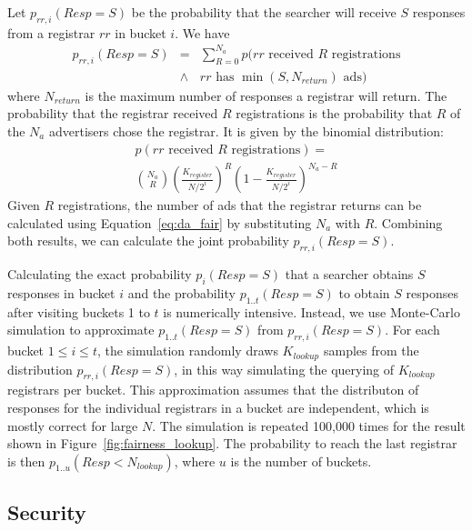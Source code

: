 Let $p_{rr,i}(Resp=S)$ be the probability that the searcher will receive $S$ responses from a registrar $rr$ in bucket $i$. We have
\begin{eqnarray*}
p_{rr,i}(Resp=S) & = & \sum_{R=0}^{N_a}{} p( \mbox{$rr$ received $R$ registrations}\\
                        & \wedge &  \mbox{$rr$ has $\min(S,N_\textit{return})$ ads})
\end{eqnarray*}
where $N_\textit{return}$ is the maximum number of responses a registrar will return. The probability that the registrar received $R$ registrations is the probability that $R$ of the $N_a$ advertisers chose the registrar. It is given by the binomial distribution:
\begin{eqnarray*}
p(\mbox{$rr$ received $R$ registrations}) = \\
\binom{N_a}{R} \left( \frac{K_\textit{register}}{N/2^i} \right)^R \left(1 - \frac{K_\textit{register}}{N/2^i} \right)^{N_a-R}
\end{eqnarray*}
Given $R$ registrations, the number of ads that the registrar returns can be calculated using Equation~\ref{eq:da_fair} by substituting $N_a$ with $R$. Combining both results, we can calculate the joint probability $p_{rr,i}(Resp=S)$.

Calculating the exact probability $p_{i}(Resp=S)$ that a searcher obtains $S$ responses in bucket $i$ and the probability $p_{1..t}(Resp=S)$ to obtain $S$ responses after visiting buckets 1 to $t$ is numerically intensive.
Instead, we use Monte-Carlo simulation to approximate $p_{1..t}(Resp=S)$ from $p_{rr,i}(Resp=S)$. For each bucket $1\le i \le t$, the simulation randomly draws $K_\textit{lookup}$ samples from the distribution $p_{rr,i}(Resp=S)$, in this way simulating the querying of $K_\textit{lookup}$ registrars per bucket. This approximation assumes that the distributon of responses for the individual registrars in a bucket are independent, which is mostly correct for large $N$. The simulation is repeated 100,000 times for the result shown in Figure~\ref{fig:fairness_lookup}.
The probability to reach the last registrar is then $p_{1..u}(Resp< N_\textit{lookup})$, where $u$ is the number of buckets.


\subsection{Security}

